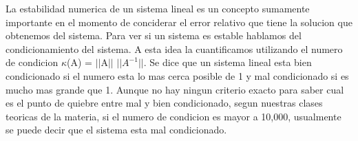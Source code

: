 \indent La estabilidad numerica de un sistema lineal es un concepto sumamente importante en el momento de conciderar  el error relativo que tiene la solucion que obtenemos del sistema. Para ver si un sistema es estable hablamos del condicionamiento del sistema. A esta idea la cuantificamos utilizando el numero de condicion $\kappa$(A) = $||$A$||$ $||A^{-1}||$. Se dice que un sistema lineal esta bien condicionado si el numero esta lo mas cerca posible de 1 y mal condicionado si es mucho mas grande que 1. Aunque no hay ningun criterio exacto para saber cual es el punto de quiebre entre mal y bien condicionado, segun nuestras clases teoricas de la materia, si el numero de condicion es mayor a 10,000, usualmente se puede decir que el sistema esta mal condicionado.\par